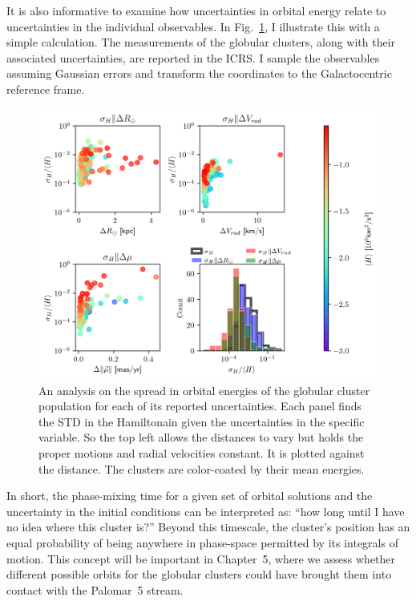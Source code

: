             It is also informative to examine how uncertainties in orbital energy relate to uncertainties in the individual observables. In Fig.~\ref{fig:energy_sensitivity_analysis_MWGCS_to_distance_RV_mu}, I illustrate this with a simple calculation. The measurements of the globular clusters, along with their associated uncertainties, are reported in the ICRS. I sample the observables assuming Gaussian errors and transform the coordinates to the Galactocentric reference frame.
            \begin{figure}[p]
                \includegraphics[width=\linewidth]{images/energy_sensitivity_analysis_MWGCS_to_errors.png}
                \caption{An analysis on the spread in orbital energies of the globular cluster population for each of its reported uncertainties. Each panel finds the STD in the Hamiltonain given the uncertainties in the specific variable. So the top left allows the distances to vary but holds the proper motions and radial velocities constant. It is plotted against the distance. The clusters are color-coated by their mean energies.}
                \label{fig:energy_sensitivity_analysis_MWGCS_to_distance_RV_mu}
            \end{figure}
            In short, the phase-mixing time for a given set of orbital solutions and the uncertainty in the initial conditions can be interpreted as: ``how long until I have no idea where this cluster is?'' Beyond this timescale, the cluster's position has an equal probability of being anywhere in phase-space permitted by its integrals of motion. This concept will be important in Chapter~5, where we assess whether different possible orbits for the globular clusters could have brought them into contact with the Palomar~5 stream.
